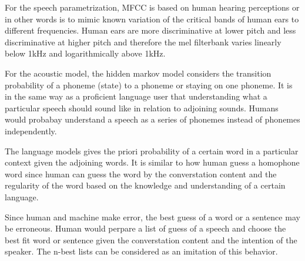 \documentclass[12pt]{article}
\newenvironment{problem}[2][Problem]{\begin{trivlist}
\item[\hskip \labelsep {\bfseries #1}\hskip \labelsep {\bfseries #2.}]}{\end{trivlist}}
\begin{document}
\begin{problem}{1.2}
    For the speech parametrization, MFCC is based on human hearing perceptions or
    in other words is to mimic known variation of the critical bands of
    human ears to different frequencies. Human ears are more discriminative at
    lower pitch and less discriminative at higher pitch and therefore the mel
    filterbank varies linearly below 1kHz and logarithmically above 1kHz.

    For the acoustic model, the hidden markov model considers the transition
    probability of a phoneme (state) to a phoneme or staying on one phoneme.
    It is in the same way as a proficient language user that understanding
    what a particular speech should sound like in relation to adjoining sounds.
    Humans would probabay understand a speech as a series of phonemes instead of
    phonemes independently.

    The language models gives the priori probability of a certain word in a
    particular context given the adjoining words. It is similar to how human
    guess a homophone word since human can guess the word by the converstation
    content and the regularity of the word based on the knowledge and understanding
    of a certain language.

    Since human and machine make error, the best guess of a word or a sentence may
    be erroneous. Human would perpare a list of guess of a speech and choose the
    best fit word or sentence given the converstation content and the intention
    of the speaker. The n-best lists can be considered as an imitation of this behavior.
\end{problem}
\end{document}
